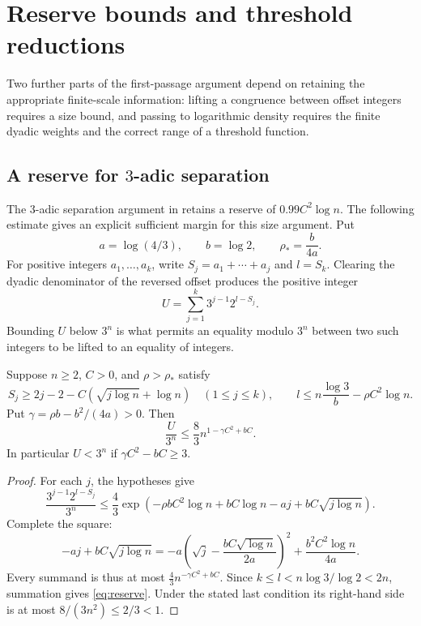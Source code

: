\section{Reserve bounds and threshold reductions}\label{sec:versions}

Two further parts of the first-passage argument depend on retaining the
appropriate finite-scale information: lifting a congruence between offset
integers requires a size bound, and passing to logarithmic density requires
the finite dyadic weights and the correct range of a threshold function.

\subsection{A reserve for \texorpdfstring{$3$}{3}-adic separation}

The $3$-adic separation argument in \cite[Section~6]{Tao7} retains a
reserve of $0.99C^2\log n$. The following estimate gives an explicit
sufficient margin for this size argument. Put
\[
 a=\log(4/3),\qquad b=\log2,\qquad \rho_*=\frac{b}{4a}.
\]
For positive integers $a_1,\ldots,a_k$, write $S_j=a_1+\cdots+a_j$
and $l=S_k$.  Clearing the dyadic denominator of the reversed offset
produces the positive integer
\[
 U=\sum_{j=1}^k3^{j-1}2^{l-S_j}.
\]
Bounding $U$ below $3^n$ is what permits an equality modulo $3^n$
between two such integers to be lifted to an equality of integers.

\begin{proposition}\label{prop:reserve}
Suppose $n\geq2$, $C>0$, and $\rho>\rho_*$ satisfy
\[
 S_j\geq2j-2-C(\sqrt{j\log n}+\log n)\quad(1\leq j\leq k),
 \qquad
 l\leq n\frac{\log3}{b}-\rho C^2\log n.
\]
Put $\gamma=\rho b-b^2/(4a)>0$.  Then
\begin{equation}\label{eq:reserve}
 \frac{U}{3^n}\leq\frac83 n^{1-\gamma C^2+bC}.
\end{equation}
In particular $U<3^n$ if $\gamma C^2-bC\geq3$.
\end{proposition}
\begin{proof}
For each $j$, the hypotheses give
\[
 \frac{3^{j-1}2^{l-S_j}}{3^n}
 \leq\frac43\exp\left(-\rho b C^2\log n+bC\log n
                  -aj+bC\sqrt{j\log n}\right).
\]
Complete the square:
\[
 -aj+bC\sqrt{j\log n}
 =-a\left(\sqrt j-\frac{bC\sqrt{\log n}}{2a}\right)^2
  +\frac{b^2C^2\log n}{4a}.
\]
Every summand is thus at most $\frac43 n^{-\gamma C^2+bC}$.
Since $k\leq l<n\log3/\log2<2n$, summation gives
\eqref{eq:reserve}.  Under the stated last condition its right-hand
side is at most $8/(3n^2)\leq2/3<1$.
\end{proof}

